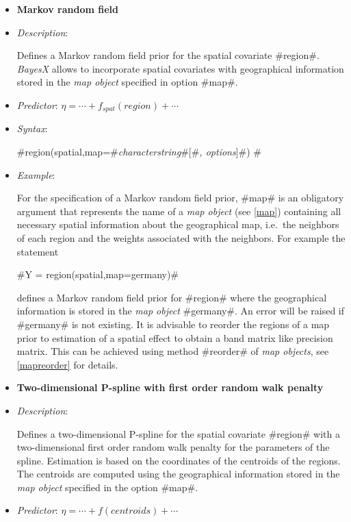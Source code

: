 \begin{itemize}
\item[]{\bf\sffamily Markov random field}

\item[] {\em Description}:

Defines a Markov random field prior for the spatial covariate
#region#. {\em BayesX} allows to incorporate spatial covariates
with geographical information stored in the {\em map object}
specified in option #map#.

\item[] {\em Predictor}: $\eta = \cdots + f_{spat}(region) +
\cdots$

\item[] {\em Syntax}:

#region(spatial,map=#{\em characterstring}#[#{\em , options}]#) #
\item[] {\em Example}:

For the specification of a Markov random field prior, #map# is an
obligatory argument that represents the name of a {\em map object}
(see \autoref{map}) containing all necessary spatial information
about the geographical map, i.e.~the neighbors of each region and
the weights associated with the neighbors. For example the
statement

#Y = region(spatial,map=germany)#

defines a Markov random field prior for #region# where the
geographical information is stored in the {\em map object}
#germany#. An error will be raised if #germany# is not existing.
It is advisable to reorder the regions of a map prior to
estimation of a spatial effect to obtain a band matrix like
precision matrix. This can be achieved using method #reorder# of
{\em map objects}, see \autoref{mapreorder} for details.

\item[]{\bf\sffamily Two-dimensional P-spline with first order
random walk penalty}

\item[] {\em Description}:

Defines a two-dimensional P-spline for the spatial covariate
#region# with a two-dimensional first order random walk penalty
for the parameters of the spline. Estimation is based on the
coordinates of the centroids of the regions. The centroids are
computed using the geographical information stored in the {\em map
object} specified in the option #map#.

\item[] {\em Predictor}: $\eta= \cdots + f(centroids) + \cdots$


\end{itemize}
